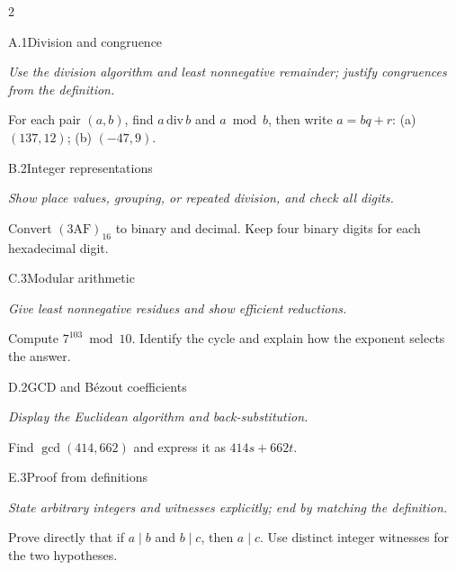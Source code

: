 \documentclass[9pt]{extarticle}
\begin{document}
\begin{multicols}{2}
\begin{CoreProblem}{A.1}{Division and congruence}
{\scriptsize\textit{Use the division algorithm and least nonnegative remainder; justify congruences from the definition.}\par}
For each pair $(a,b)$, find $a\,\mathrm{div}\,b$ and $a\bmod b$, then write
$a=bq+r$: (a) $(137,12)$; (b) $(-47,9)$.
\end{CoreProblem}
\begin{CoreProblem}{B.2}{Integer representations}
{\scriptsize\textit{Show place values, grouping, or repeated division, and check all digits.}\par}
Convert $(\mathrm{3AF})_{16}$ to binary and decimal. Keep four binary digits
for each hexadecimal digit.
\end{CoreProblem}
\begin{CoreProblem}{C.3}{Modular arithmetic}
{\scriptsize\textit{Give least nonnegative residues and show efficient reductions.}\par}
Compute $7^{103}\bmod10$. Identify the cycle and explain how the exponent
selects the answer.
\end{CoreProblem}
\columnbreak
\begin{CoreProblem}{D.2}{GCD and B\'ezout coefficients}
{\scriptsize\textit{Display the Euclidean algorithm and back-substitution.}\par}
Find $\gcd(414,662)$ and express it as $414s+662t$.
\end{CoreProblem}
\begin{CoreProblem}{E.3}{Proof from definitions}
{\scriptsize\textit{State arbitrary integers and witnesses explicitly; end by matching the definition.}\par}
Prove directly that if $a\mid b$ and $b\mid c$, then $a\mid c$. Use distinct
integer witnesses for the two hypotheses.
\end{CoreProblem}
\end{multicols}
\CoreWorkArea
\FormBreak
{}
\end{document}
